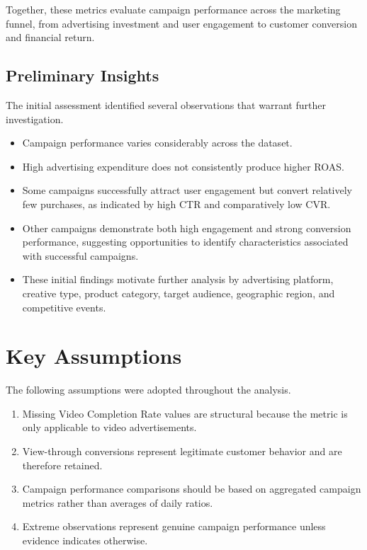 \documentclass[11pt]{article}
\begin{document}
	Together, these metrics evaluate campaign performance across the marketing funnel, from advertising investment and user engagement to customer conversion and financial return.
	
	\subsection{Preliminary Insights}
	
	The initial assessment identified several observations that warrant further investigation.
	
	\begin{itemize}
		
		\item Campaign performance varies considerably across the dataset.
		
		\item High advertising expenditure does not consistently produce higher ROAS.
		
		\item Some campaigns successfully attract user engagement but convert relatively few purchases, as indicated by high CTR and comparatively low CVR.
		
		\item Other campaigns demonstrate both high engagement and strong conversion performance, suggesting opportunities to identify characteristics associated with successful campaigns.
		
		\item These initial findings motivate further analysis by advertising platform, creative type, product category, target audience, geographic region, and competitive events.
		
	\end{itemize}
	
	\section{Key Assumptions}
	
	The following assumptions were adopted throughout the analysis.
	
	\begin{enumerate}
		
		\item Missing Video Completion Rate values are structural because the metric is only applicable to video advertisements.
		
		\item View-through conversions represent legitimate customer behavior and are therefore retained.
		
		\item Campaign performance comparisons should be based on aggregated campaign metrics rather than averages of daily ratios.
		
		\item Extreme observations represent genuine campaign performance unless evidence indicates otherwise.
		
	\end{enumerate}
	
\end{document}
